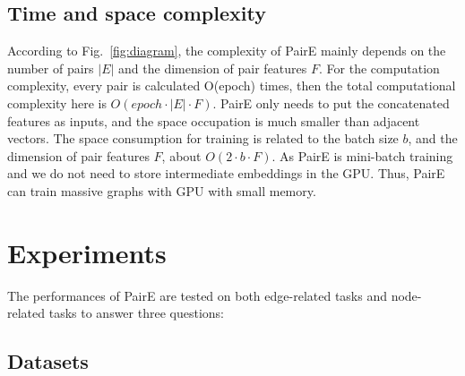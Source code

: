 \documentclass[10pt,journal,compsoc]{IEEEtran}
\begin{document}
\subsection{Time and space complexity}
According to Fig.~\ref{fig:diagram}, the complexity of PairE mainly depends on the number of pairs $|E|$ and the dimension of pair features $F$. For the computation complexity, every pair is calculated O(epoch) times, then the total computational complexity here is $O(epoch\cdot|E|\cdot F)$.
PairE only needs to put the concatenated features as inputs, and the space occupation is much smaller than adjacent vectors.  The space consumption for training is related to the batch size $b$, and the dimension of pair features $F$, about $O(2\cdot b\cdot F)$. As PairE is mini-batch training and we do not need to store intermediate embeddings in the GPU. Thus, PairE can train massive graphs with GPU with small memory.



















\section{Experiments}
\label{sec:experiment}

The performances of PairE are tested on both edge-related tasks and node-related tasks to answer three questions: 





\subsection{Datasets}
\label{sec:setup}
\end{document}
